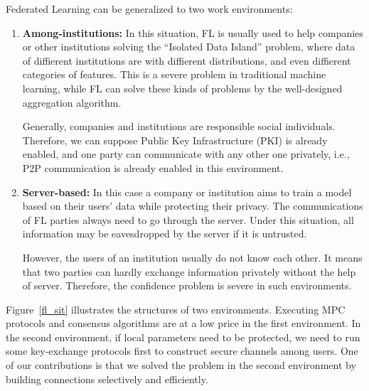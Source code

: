 Federated Learning can be generalized to two work environments:

\begin{enumerate}

    \item \textbf{Among-institutions:} In this situation, FL is usually used to help companies or other institutions solving the ``Isolated Data Island'' problem, where data of diffierent institutions are with diffierent distributions, and even diffierent categories of features. This is a severe problem in traditional machine learning, while FL can solve these kinds of problems by the well-designed aggregation algorithm. 

    Generally, companies and institutions are responsible social individuals. Therefore, we can suppose Public Key Infrastructure (PKI) is already enabled, and one party can communicate with any other one privately, i.e., P2P communication is already enabled in this environment.

    \item \textbf{Server-based:} In this case a company or institution aims to train a model based on their users' data while protecting their privacy. The communications of FL parties always need to go through the server. Under this situation, all information may be eavesdropped by the server if it is untrusted. 

    However, the users of an institution usually do not know each other. It means that two parties can hardly exchange information privately without the help of server. Therefore, the confidence problem is severe in such environments.

\end{enumerate}

Figure~\ref{fl_sit} illustrates the structures of two environments. Executing MPC protocols and consensus algorithms are at a low price in the first environment. In the second environment, if local parameters need to be protected, we need to run some key-exchange protocols first to construct secure channels among users. One of our contributions is that we solved the problem in the second environment by building connections selectively and efficiently.


